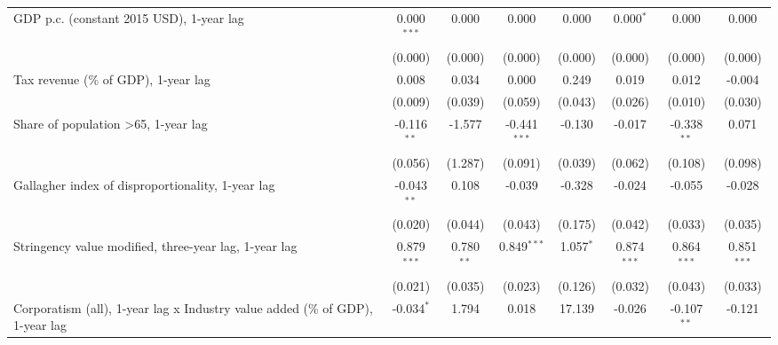 \begin{table}[htbp]
\begin{tabular}{lccccccc}
      GDP p.c. (constant 2015 USD), 1-year lag                                      & 0.000$^{***}$ & 0.000                     & 0.000          & 0.000            & 0.000$^{*}$     & 0.000           & 0.000\\   
                                                                                    & (0.000)       & (0.000)                   & (0.000)        & (0.000)          & (0.000)         & (0.000)         & (0.000)\\   
      Tax revenue (\% of GDP), 1-year lag                                           & 0.008         & 0.034                     & 0.000          & 0.249            & 0.019           & 0.012           & -0.004\\   
                                                                                    & (0.009)       & (0.039)                   & (0.059)        & (0.043)          & (0.026)         & (0.010)         & (0.030)\\   
      Share of population >65, 1-year lag                                           & -0.116$^{**}$ & -1.577                    & -0.441$^{***}$ & -0.130           & -0.017          & -0.338$^{**}$   & 0.071\\   
                                                                                    & (0.056)       & (1.287)                   & (0.091)        & (0.039)          & (0.062)         & (0.108)         & (0.098)\\   
      Gallagher index of disproportionality, 1-year lag                             & -0.043$^{**}$ & 0.108                     & -0.039         & -0.328           & -0.024          & -0.055          & -0.028\\   
                                                                                    & (0.020)       & (0.044)                   & (0.043)        & (0.175)          & (0.042)         & (0.033)         & (0.035)\\   
      Stringency value modified, three-year lag, 1-year lag                         & 0.879$^{***}$ & 0.780$^{**}$              & 0.849$^{***}$  & 1.057$^{*}$      & 0.874$^{***}$   & 0.864$^{***}$   & 0.851$^{***}$\\   
                                                                                    & (0.021)       & (0.035)                   & (0.023)        & (0.126)          & (0.032)         & (0.043)         & (0.033)\\   
      Corporatism (all), 1-year lag x Industry value added (\% of GDP), 1-year lag  & -0.034$^{*}$  & 1.794                     & 0.018          & 17.139           & -0.026          & -0.107$^{**}$   & -0.121\\   

\end{tabular}
\end{table}
